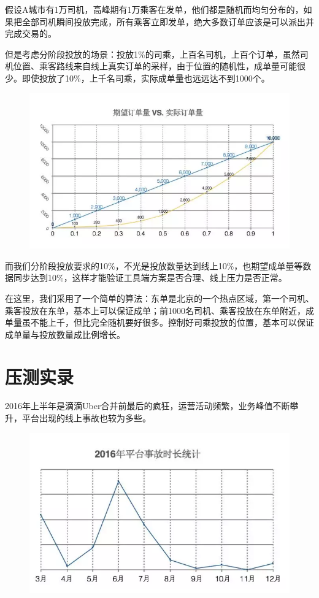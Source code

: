 \documentclass[12pt]{article}
\begin{document}
假设A城市有1万司机，高峰期有1万乘客在发单，他们都是随机而均匀分布的，如果把全部司机瞬间投放完成，所有乘客立即发单，绝大多数订单应该是可以派出并完成交易的。

但是考虑分阶段投放的场景：投放1\%的司乘，上百名司机，上百个订单，虽然司机位置、乘客路线来自线上真实订单的采样，由于位置的随机性，成单量可能很少。即使投放了10\%，上千名司乘，实际成单量也远远达不到1000个。
\begin{figure}[H]
    \centering
    \includegraphics[width=.6\textwidth]{fig/DIDI_Pressure_9.png}
\end{figure}

而我们分阶段投放要求的10\%，不光是投放数量达到线上10\%，也期望成单量等数据同步达到10\%，这样才能验证工具端方案是否合理、线上压力是否正常。

在这里，我们采用了一个简单的算法：东单是北京的一个热点区域，第一个司机、乘客投放在东单，基本上可以保证成单；前1000名司机、乘客投放在东单附近，成单量虽不能上千，但比完全随机要好很多。控制好司乘投放的位置，基本可以保证成单量与投放数量成比例增长。

\section{压测实录}
2016年上半年是滴滴Uber合并前最后的疯狂，运营活动频繁，业务峰值不断攀升，平台出现的线上事故也较为多些。
\begin{figure}[H]
    \centering
    \includegraphics[width=.6\textwidth]{fig/DIDI_Pressure_10.png}
\end{figure}
\end{document}
